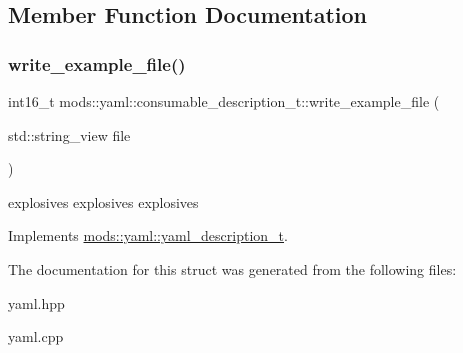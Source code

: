 \subsection{Member Function Documentation}
\mbox{\label{structmods_1_1yaml_1_1consumable__description__t_a803c6d4b65a1cba30a5917cd397e2881}} 
\subsubsection{\texorpdfstring{write\+\_\+example\+\_\+file()}{write\_example\_file()}}
{\footnotesize\ttfamily int16\+\_\+t mods\+::yaml\+::consumable\+\_\+description\+\_\+t\+::write\+\_\+example\+\_\+file (\begin{DoxyParamCaption}\item[{std\+::string\+\_\+view}]{file }\end{DoxyParamCaption})\hspace{0.3cm}{\ttfamily [virtual]}}

explosives explosives explosives 

Implements \hyperlink{structmods_1_1yaml_1_1yaml__description__t}{mods\+::yaml\+::yaml\+\_\+description\+\_\+t}.



The documentation for this struct was generated from the following files\+:\begin{DoxyCompactItemize}
\item 
yaml.\+hpp\item 
yaml.\+cpp\end{DoxyCompactItemize}
